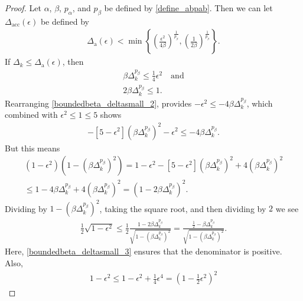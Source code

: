 \documentclass{article}
\theoremstyle{case}
\numberwithin{theorem}{subsection}
\newcommand{\dacc}{{\Delta_{\textrm{acc}}}}
\newcommand{\dacco}{{\Delta_{\textrm{a}}}}
\newcommand{\dk}{\Delta_k}
\newcommand{\minangledelta}{{\Delta_{\alpha^{\star}}}}
\begin{document}
\begin{proof}
Let $\alpha$, $\beta$, $p_{\alpha}$, and $p_{\beta}$ be defined by \cref{define_abpab}.
Then we can let $\dacc(\epsilon)$ be defined by
\begin{align}
\dacco(\epsilon) < \min\left\{
\left(\frac {\epsilon ^2} {4\beta} \right)^{\frac 1 {p_{\beta}}},
\left(\frac 1 {2\beta}\right)^{\frac 1 {p_{\beta}}}
\right\}\label{define_delta_accuracy_old}.
\end{align}
If $\dk \le \dacco(\epsilon)$, then
\begin{align}
\beta\dk^{p_{\beta}} \le \frac 1 {4} \epsilon^2 \quad \textrm{and}\label{boundedbeta_deltasmall_2} \\
2\beta\dk^{p_{\beta}} \le 1. \label{boundedbeta_deltasmall_3}
\end{align}
Rearranging \cref{boundedbeta_deltasmall_2}, provides $-\epsilon^2 \le -4\beta\dk^{p_{\beta}}$,
which combined with $\epsilon ^2 \le 1 \le 5$ shows
\begin{align*}
-\left[5- \epsilon^2\right]\left(\beta\dk^{p_{\beta}}\right)^2  - \epsilon^2 \le -4\beta\dk^{p_{\beta}}.
\end{align*}
But this means
\begin{align*}
\left(1 - \epsilon^2\right)\left(1 - \left(\beta\dk^{p_{\beta}}\right)^2\right) 
= 1 - \epsilon^2 - \left[5 - \epsilon^2\right]\left(\beta\dk^{p_{\beta}}\right)^2 + 4\left(\beta\dk^{p_{\beta}}\right)^2 \\
\le 1 - 4\beta\dk^{p_{\beta}} + 4\left(\beta\dk^{p_{\beta}}\right)^2 = \left(1 - 2\beta\dk^{p_{\beta}}\right)^2.
\end{align*}
Dividing by $1 - \left(\beta\dk^{p_{\beta}}\right)^2$, taking the square root, and then dividing by $2$ we see
\begin{align}
\frac 1 2 \sqrt{1 - \epsilon^2} \le \frac 1 2 \frac{1 -2\beta\dk^{p_{\beta}}}{\sqrt{1 - \left(\beta\dk^{p_{\beta}}\right)^2}}
= \frac{\frac 1 2 -\beta\dk^{p_{\beta}}}{\sqrt{1 - \left(\beta\dk^{p_{\beta}}\right)^2}}. \label{boundedbeta_eqn1}
\end{align}
Here, \cref{boundedbeta_deltasmall_3} ensures that the denominator is positive.
Also,
\begin{align*}
1 - \epsilon^2 \le 1 - \epsilon^2 + \frac 1 4 \epsilon^4 
= \left(1 - \frac 1 2 \epsilon^2 \right)^2 

\end{align*}
\end{proof}
\end{document}
